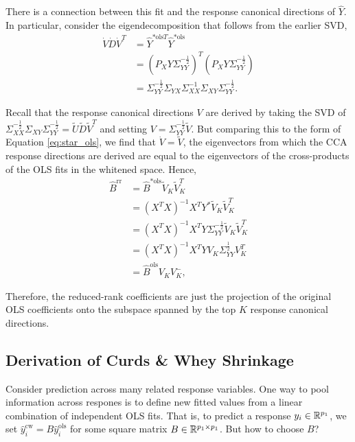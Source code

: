\documentclass{article}
\begin{document}
There is a connection between this fit and the response canonical directions of
$\hat{Y}$. In particular, consider the eigendecomposition that follows from the
earlier SVD,
\begin{align}
\dot{V}\dot{D}\dot{V}^{T} &=   \hat{Y}^{\ast \text{ols} T}  \hat{Y}^{\ast \text{ols}} \nonumber \\
&= \left(P_{X}Y\Sigma_{YY}^{-\frac{1}{2}}\right)^{T}\left(P_{X}Y\Sigma_{YY}^{-\frac{1}{2}}\right)\nonumber \\
  &= \Sigma_{YY}^{-\frac{1}{2}}\Sigma_{YX} \Sigma_{XX}^{-1}\Sigma_{XY}\Sigma_{YY}^{-\frac{1}{2}}. \label{eq:star_ols}
\end{align}

Recall that the response canonical directions $V$ are derived by taking the SVD
of $\Sigma_{XX}^{-\frac{1}{2}}\Sigma_{XY}\Sigma_{YY}^{-\frac{1}{2}} =
\tilde{U}\tilde{D}\tilde{V}^{T}$ and setting $V =
\Sigma_{YY}^{-\frac{1}{2}}\tilde{V}$. But comparing this to the form of Equation
\ref{eq:star_ols}, we find that $\dot{V} = \tilde{V}$, the eigenvectors from
which the CCA response directions are derived are equal to the eigenvectors of
the cross-products of the OLS fits in the whitened space. Hence,
\begin{align*}
\hat{B}^{\text{rr}} &= \hat{B}^{\ast \text{ols}}\tilde{V}_{K}\tilde{V}_{K}^{T} \\
&= \left(X^{T}X\right)^{-1}X^{T}Y^{\ast}\tilde{V}_{K}\tilde{V}_{K}^{T} \\
&= \left(X^{T}X\right)^{-1}X^{T}Y\Sigma_{YY}^{-\frac{1}{2}}\tilde{V}_{K}\tilde{V}_{K}^{T} \\
&= \left(X^{T}X\right)^{-1}X^{T}Y V_{K} \Sigma_{YY}^{\frac{1}{2}}V_{K}^{T} \\
&= \hat{B}^{\text{ols}}V_{K}V_{K}^{-},
\end{align*}

Therefore, the reduced-rank coefficients are just the projection of the original
OLS coefficients onto the subspace spanned by the top $K$ response canonical
directions.

\subsection{Derivation of Curds \& Whey Shrinkage}
\label{subsec:derivation_curds_and_whey}

Consider prediction across many related response variables. One way to pool
information across respones is to define new fitted values from a linear
combination of independent OLS fits. That is, to predict a response $y_{i} \in
\mathbb{R}^{p_{1}}$, we set $\hat{y}^{\text{cw}}_{i} = B\hat{y}^{\text{ols}}_{i}$
for some square matrix $B \in \mathbb{R}^{p_{1} \times p_{1}}$. But how to choose
$B$?
\end{document}

